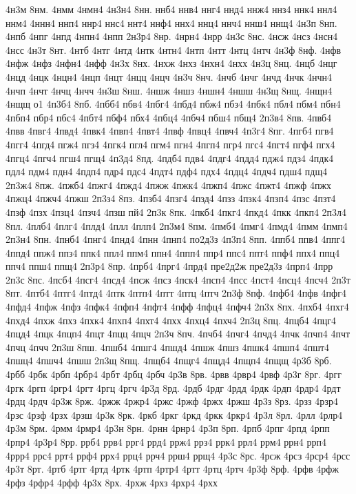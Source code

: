 {4н3м
8нм.
4нмм
4нмн4
4н3н4
8нн.
ннб4
ннв4
ннг4
ннд4
ннж4
ннз4
ннк4
ннл4
ннм4
4ннн4
ннп4
ннр4
ннс4
ннт4
ннф4
ннх4
ннц4
ннч4
ннш4
ннщ4
4н3п
8нп.
4нпб
4нпг
4нпд
4нпн4
4нпп
2н3р4
8нр.
4нрн4
4нрр
4н3с
8нс.
4нсж
4нсз
4нсн4
4нсс
4н3т
8нт.
4нтб
4нтг
4нтд
4нтк
4нтн4
4нтп
4нтт
4нтц
4нтч
4н3ф
8нф.
4нфв
4нфж
4нфз
4нфн4
4нфф
4н3х
8нх.
4нхж
4нхз
4нхн4
4нхх
4н3ц
8нц.
4нцб
4нцг
4нцд
4нцк
4нцн4
4нцп
4нцт
4нцц
4нцч
4н3ч
8нч.
4нчб
4нчг
4нчд
4нчк
4нчн4
4нчп
4нчт
4нчц
4нчч
4н3ш
8нш.
4ншж
4ншз
4ншн4
4ншш
4н3щ
8нщ.
4нщн4
4нщщ
о1
4п3б4
8пб.
4пбб4
пбв4
4пбг4
4пбд4
пбж4
пбз4
4пбк4
пбл4
пбм4
пбн4
4пбп4
пбр4
пбс4
4пбт4
пбф4
пбх4
4пбц4
4пбч4
пбш4
пбщ4
2п3в4
8пв.
4пвб4
4пвв
4пвг4
4пвд4
4пвк4
4пвп4
4пвт4
4пвф
4пвц4
4пвч4
4п3г4
8пг.
4пгб4
пгв4
4пгг4
4пгд4
пгж4
пгз4
4пгк4
пгл4
пгм4
пгн4
4пгп4
пгр4
пгс4
4пгт4
пгф4
пгх4
4пгц4
4пгч4
пгш4
пгщ4
4п3д4
8пд.
4пдб4
пдв4
4пдг4
4пдд4
пдж4
пдз4
4пдк4
пдл4
пдм4
пдн4
4пдп4
пдр4
пдс4
4пдт4
пдф4
пдх4
4пдц4
4пдч4
пдш4
пдщ4
2п3ж4
8пж.
4пжб4
4пжг4
4пжд4
4пжж
4пжк4
4пжп4
4пжс
4пжт4
4пжф
4пжх
4пжц4
4пжч4
4пжш
2п3з4
8пз.
4пзб4
4пзг4
4пзд4
4пзз
4пзк4
4пзп4
4пзс
4пзт4
4пзф
4пзх
4пзц4
4пзч4
4пзш
пй4
2п3к
8пк.
4пкб4
4пкг4
4пкд4
4пкк
4пкп4
2п3л4
8пл.
4плб4
4плг4
4плд4
4плл
4плп4
2п3м4
8пм.
4пмб4
4пмг4
4пмд4
4пмм
4пмп4
2п3н4
8пн.
4пнб4
4пнг4
4пнд4
4пнн
4пнп4
по2д3з
4п3п4
8пп.
4ппб4
ппв4
4ппг4
4ппд4
ппж4
ппз4
ппк4
ппл4
ппм4
ппн4
4ппп4
ппр4
ппс4
ппт4
ппф4
ппх4
ппц4
ппч4
ппш4
ппщ4
2п3р4
8пр.
4прб4
4прг4
4прд4
пре2д2ж
пре2д3з
4прп4
4прр
2п3с
8пс.
4псб4
4псг4
4псд4
4псж
4псз
4пск4
4псп4
4псс
4пст4
4псц4
4псч4
2п3т
8пт.
4птб4
4птг4
4птд4
4птк
4птп4
4птт
4птц
4птч
2п3ф
8пф.
4пфб4
4пфв
4пфг4
4пфд4
4пфж
4пфз
4пфк4
4пфп4
4пфт4
4пфф
4пфц4
4пфч4
2п3х
8пх.
4пхб4
4пхг4
4пхд4
4пхж
4пхз
4пхк4
4пхп4
4пхт4
4пхх
4пхц4
4пхч4
2п3ц
8пц.
4пцб4
4пцг4
4пцд4
4пцк
4пцп4
4пцт
4пцц
4пцч
2п3ч
8пч.
4пчб4
4пчг4
4пчд4
4пчк
4пчп4
4пчт
4пчц
4пчч
2п3ш
8пш.
4пшб4
4пшг4
4пшд4
4пшж
4пшз
4пшк4
4пшп4
4пшт4
4пшц4
4пшч4
4пшш
2п3щ
8пщ.
4пщб4
4пщг4
4пщд4
4пщп4
4пщщ
4р3б
8рб.
4рбб
4рбк
4рбп
4рбр4
4рбт
4рбц
4рбч
4р3в
8рв.
4рвв
4рвр4
4рвф
4р3г
8рг.
4ргг
4ргк
4ргп
4ргр4
4ргт
4ргц
4ргч
4р3д
8рд.
4рдб
4рдг
4рдд
4рдк
4рдп
4рдр4
4рдт
4рдц
4рдч
4р3ж
8рж.
4ржж
4ржр4
4ржс
4ржф
4ржх
4ржш
4р3з
8рз.
4рзз
4рзр4
4рзс
4рзф
4рзх
4рзш
4р3к
8рк.
4ркб
4ркг
4ркд
4ркк
4ркр4
4р3л
8рл.
4рлл
4рлр4
4р3м
8рм.
4рмм
4рмр4
4р3н
8рн.
4рнн
4рнр4
4р3п
8рп.
4рпб
4рпг
4рпд
4рпп
4рпр4
4р3р4
8рр.
ррб4
ррв4
ррг4
ррд4
ррж4
ррз4
ррк4
ррл4
ррм4
ррн4
ррп4
4ррр4
ррс4
ррт4
ррф4
ррх4
ррц4
ррч4
ррш4
ррщ4
4р3с
8рс.
4рсж
4рсз
4рср4
4рсс
4р3т
8рт.
4ртб
4ртг
4ртд
4ртк
4ртп
4ртр4
4ртт
4ртц
4ртч
4р3ф
8рф.
4рфв
4рфж
4рфз
4рфр4
4рфф
4р3х
8рх.
4рхж
4рхз
4рхр4
4рхх
}
